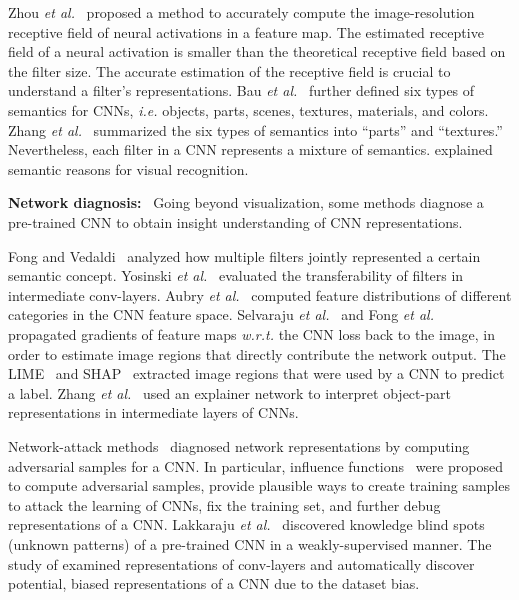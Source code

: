 \documentclass[10pt,twocolumn,letterpaper]{article}
\begin{document}
Zhou \emph{et al.}~\cite{CNNSemanticDeep} proposed a method to accurately compute the image-resolution receptive field of neural activations in a feature map. The estimated receptive field of a neural activation is smaller than the theoretical receptive field based on the filter size. The accurate estimation of the receptive field is crucial to understand a filter's representations. Bau \emph{et al.}~\cite{Interpretability} further defined six types of semantics for CNNs, \emph{i.e.} objects, parts, scenes, textures, materials, and colors. Zhang \emph{et al.}~\cite{explanatoryGraph} summarized the six types of semantics into ``parts'' and ``textures.'' Nevertheless, each filter in a CNN represents a mixture of semantics. \cite{interpretableDecomposition} explained semantic reasons for visual recognition.

\textbf{Network diagnosis:}{\verb| |} Going beyond visualization, some methods diagnose a pre-trained CNN to obtain insight understanding of CNN representations.

Fong and Vedaldi~\cite{net2vector} analyzed how multiple filters jointly represented a certain semantic concept. Yosinski \emph{et al.}~\cite{CNNAnalysis_2} evaluated the transferability of filters in intermediate conv-layers. Aubry \emph{et al.}~\cite{CNNVisualization_5} computed feature distributions of different categories in the CNN feature space. Selvaraju \emph{et al.}~\cite{visualCNN_grad_2} and Fong \emph{et al.}~\cite{visualCNN_grad} propagated gradients of feature maps \emph{w.r.t.} the CNN loss back to the image, in order to estimate image regions that directly contribute the network output. The LIME~\cite{trust} and SHAP~\cite{shap} extracted image regions that were used by a CNN to predict a label. Zhang \emph{et al.}~\cite{explainer} used an explainer network to interpret object-part representations in intermediate layers of CNNs.

Network-attack methods~\cite{CNNInfluence,CNNAnalysis_1} diagnosed network representations by computing adversarial samples for a CNN. In particular, influence functions~\cite{CNNInfluence} were proposed to compute adversarial samples, provide plausible ways to create training samples to attack the learning of CNNs, fix the training set, and further debug representations of a CNN. Lakkaraju \emph{et al.}~\cite{banditUnknown} discovered knowledge blind spots (unknown patterns) of a pre-trained CNN in a weakly-supervised manner. The study of \cite{CNNBias} examined representations of conv-layers and automatically discover potential, biased representations of a CNN due to the dataset bias.
\end{document}
